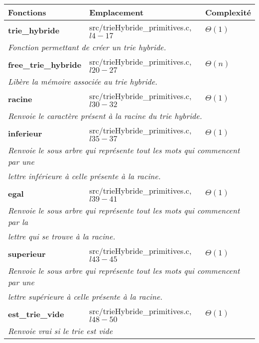 \documentclass[10pt]{report}
\begin{document}
\begin{center}
  \begin{table}
    \begin{tabular}{|l|l|l|}
      \hline  \textbf{Fonctions} & \textbf{Emplacement} & \textbf{Complexité}\\  \hline
      \textbf{trie\_hybride} & src/trieHybride\_primitives.c, $l4-17$ & $\Theta(1)$ \\ \hline 
      \multicolumn{3}{|l|}{\it{Fonction permettant de créer un trie hybride.}} \\ \hline
      \textbf{free\_trie\_hybride} & src/trieHybride\_primitives.c, $l20-27$ & $\Theta(n)$ \\ \hline 
      \multicolumn{3}{|l|}{\it{Libère la mémoire associée au trie hybride.}} \\ \hline
      \textbf{racine} & src/trieHybride\_primitives.c, $l30-32$  & $\Theta(1)$ \\ \hline 
      \multicolumn{3}{|l|}{\it{Renvoie le caractère présent à la racine du trie hybride.}} \\ \hline
      \textbf{inferieur} & src/trieHybride\_primitives.c, $l35-37$  & $\Theta(1)$ \\ \hline 
      \multicolumn{3}{|l|}{\it{Renvoie le sous arbre qui représente tout les mots qui commencent par une}} \\     
      \multicolumn{3}{|l|}{\it{lettre inférieure à celle présente à la racine.}} \\ \hline  
      \textbf{egal} & src/trieHybride\_primitives.c, $l39-41$  & $\Theta(1)$ \\ \hline 
      \multicolumn{3}{|l|}{\it{Renvoie le sous arbre qui représente tout les mots qui commencent par la}} \\ 
      \multicolumn{3}{|l|}{\it{lettre qui se trouve à la racine.}} \\ \hline  
      \textbf{superieur} & src/trieHybride\_primitives.c, $l43-45$  & $\Theta(1)$ \\ \hline 
      \multicolumn{3}{|l|}{\it{Renvoie le sous arbre qui représente tout les mots qui commencent par une}} \\     
      \multicolumn{3}{|l|}{\it{lettre supérieure à celle présente à la racine.}} \\ \hline  
      \textbf{est\_trie\_vide} & src/trieHybride\_primitives.c, $l48-50$  & $\Theta(1)$ \\ \hline 
      \multicolumn{3}{|l|}{\it{Renvoie vrai si le trie est vide}} \\   \hline   

\end{tabular}
\end{table}
\end{center}
\end{document}
